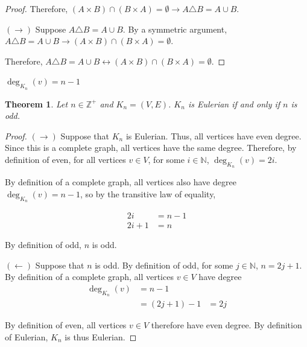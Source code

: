 \documentclass{article}
\newtheorem{theorem}{Theorem}
\begin{document}
\begin{outline}[enumerate]
\begin{proof}
        Therefore, $(A \times B) \cap (B \times A) = \emptyset \rightarrow A \triangle B = A \cup B$.

        $(\rightarrow)$ Suppose $A \triangle B = A \cup B$. By a symmetric argument, $A \triangle B = A \cup B \rightarrow (A \times B) \cap (B \times A) = \emptyset$.

        Therefore, $A \triangle B = A \cup B \leftrightarrow (A \times B) \cap (B \times A) = \emptyset$.
    \end{proof}
 
    \1 $\deg_{K_n}(v) = n - 1$
    \1 \begin{theorem}
        Let $n \in \mathbb{Z}^+$ and $K_n = (V, E)$. $K_n$ is Eulerian if and only if $n$ is odd.
    \end{theorem}
    \begin{proof}
        $(\rightarrow)$ Suppose that $K_n$ is Eulerian. Thus, all vertices have even degree. Since this is a complete graph, all vertices have the same degree. Therefore, by definition of even, for all vertices $v \in V$, for some $i \in \mathbb{N}$, $\deg_{K_n}(v) = 2i$. 
        
        By definition of a complete graph, all vertices also have degree $\deg_{K_n}(v) = n - 1$, so by the transitive law of equality,

        \begin{equation}
            \begin{aligned}
                2i &= n - 1 \\
                2i + 1 &= n
            \end{aligned}
        \end{equation}

        By definition of odd, $n$ is odd.

        $(\leftarrow)$ Suppose that $n$ is odd. By definition of odd, for some $j \in \mathbb{N}$, $n = 2j + 1$. By definition of a complete graph, all vertices $v \in V$ have degree 
        \begin{equation}
            \begin{aligned}
                \deg_{K_n}(v) &= n - 1 \\
                &= (2j + 1) - 1
                &= 2j
            \end{aligned}
        \end{equation}

        By definition of even, all vertices $v \in V$ therefore have even degree. By definition of Eulerian, $K_n$ is thus Eulerian.


\end{proof}
\end{outline}
\end{document}
